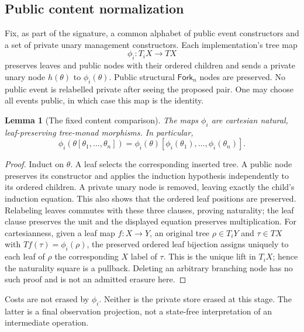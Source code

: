 \documentclass[11pt,a4paper]{article}
\newtheorem{lemma}[theorem]{Lemma}
\theoremstyle{definition}
\begin{document}
\subsection{Public content normalization}
Fix, as part of the signature, a common alphabet of public event
constructors and a set of private unary management constructors. Each
implementation's tree map
\[
 \phi_i:T_iX\longrightarrow TX
\]
preserves leaves and public nodes with their ordered children and sends
a private unary node $h(\theta)$ to $\phi_i(\theta)$. Public structural
$\mathsf{Fork}_n$ nodes are preserved. No public event is relabelled
private after seeing the proposed pair. One may choose all events public,
in which case this map is the identity.

\begin{lemma}[The fixed content comparison]\label{lem:normalization}
The maps $\phi_i$ are cartesian natural, leaf-preserving tree-monad morphisms.
In particular,
\[
 \phi_i(\theta[\theta_1,\ldots,\theta_n])
 =\phi_i(\theta)[\phi_i(\theta_1),\ldots,\phi_i(\theta_n)].
\]
\end{lemma}
\begin{proof}
Induct on $\theta$. A leaf selects the corresponding inserted tree.
A public node preserves its constructor and applies the induction
hypothesis independently to its ordered children. A private unary node
is removed, leaving exactly the child's induction equation. This also
shows that the ordered leaf positions are preserved. Relabeling leaves
commutes with these three clauses, proving naturality; the leaf clause
preserves the unit and the displayed equation preserves multiplication.
For cartesianness, given a leaf map $f:X\to Y$, an original tree
$\rho\in T_iY$ and $\tau\in TX$ with
$Tf(\tau)=\phi_i(\rho)$, the preserved ordered leaf bijection assigns
uniquely to each leaf of $\rho$ the corresponding $X$ label of $\tau$.
This is the unique lift in $T_iX$; hence the naturality square is a
pullback. Deleting an arbitrary branching node has no such proof and is
not an admitted erasure here.
\end{proof}
Costs are not erased by $\phi_i$. Neither is the private store erased at
this stage. The latter is a final observation projection, not a
state-free interpretation of an intermediate operation.
\end{document}
